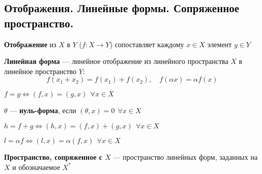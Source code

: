 \subsection{Отображения. Линейные формы. Сопряженное пространство.}
\begin{definition}
    \textbf{Отображение} из $X$ в $Y$ ($f:X\to Y$) сопоставляет каждому $x\in X$ элемент $y\in Y$
\end{definition}
\begin{definition}
    \textbf{Линейная форма} --- линейное отображение из линейного пространства $X$ в линейное пространство $Y$:
    $$f(x_1+x_2)=f(x_1)+f(x_2), \quad f(\alpha x)=\alpha f(x)$$
\end{definition}
\begin{definition}
    $f=g\Leftrightarrow (f,x)=(g,x) \ \ \forall x\in X$
\end{definition}
\begin{definition}
    $\theta$ --- \textbf{нуль-форма}, если $(\theta, x)=0 \ \ \forall x\in X$
\end{definition}
\begin{definition}
    $h=f+g \Leftrightarrow (h,x)=(f,x)+(g,x) \ \ \forall x\in X$
\end{definition}
\begin{definition}
    $l=\alpha f \Leftrightarrow (l, x)=\alpha(f,x) \ \ \forall x\in X$
\end{definition}
\begin{definition}
    \textbf{Пространство, сопряженное с $X$} --- пространство линейных форм, заданных на $X$ и обозначаемое $X^*$
\end{definition}

